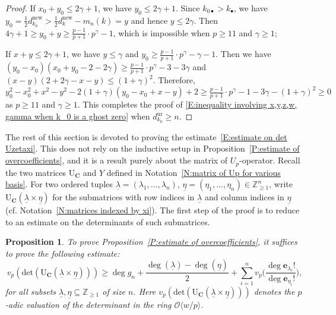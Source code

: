 \documentclass[12pt]{amsart}
\newtheorem{proposition}[subsection]{Proposition}
\theoremstyle{definition}
\numberwithin{equation}{subsection}
\def\calO{\mathcal{O}}
\def\ZZ{\mathbb{Z}}
\def\bfe{\mathbf{e}}
\def\bfC{\mathbf{C}}
\def\rmU{\mathrm{U}}
\newcommand{\new}{\mathrm{new}}
\renewcommand{\det}{\mathrm{det}}
\newcommand{\ur}{\mathrm{ur}}
\begin{document}
\begin{proof}
		 
        
        If $x_0+y_0\leq 2\gamma+1$, we have $y_0\leq 2\gamma+1$. Since $k_{0\bullet}>k_\bullet$, we have $y_0=\tfrac 12 d_{k_0}^\new>\tfrac 12 d_k^\new-m_n(k)=y$ and hence $y\leq 2\gamma$. Then $4\gamma+1\geq y_0+y\geq \frac{p-1}{p+1}\cdot p^\gamma-1$, which is impossible when $p\geq 11$ and $\gamma\geq 1$;
		
        If $x+y\leq 2\gamma+1$, we have $y\leq \gamma$ and $y_0\geq \frac{p-1}{p+1}\cdot p^\gamma-\gamma-1$. Then we have $(y_0-x_0)(x_0+y_0-2-2\gamma)\geq \frac{p-1}{p+1}\cdot p^\gamma-3-3\gamma$ and $(x-y)(2+2\gamma-x-y)\leq (1+\gamma)^2$. Therefore,
			\[
			y_0^2-x_0^2+x^2-y^2-2(1+\gamma)(y_0-x_0+x-y)+2\geq \tfrac{p-1}{p+1}\cdot p^\gamma-1-3\gamma-(1+\gamma)^2\geq 0
			\]
			as $p\geq 11$ and $\gamma\geq 1$. This completes the proof of \eqref{E:inequality involving x,y,z,w, gamma when k_0 is a ghost zero} when $d_{k_0}^\ur\geq n$.
		\qedhere 
\end{proof}

The rest of this section is devoted to proving the estimate~\eqref{E:estimate on det Uzetaxi}. This does not rely on the inductive setup in Proposition~\ref{P:estimate of overcoefficients}, and it is a result purely about the matrix of $U_p$-operator.  Recall the two matrices $\rmU_{\bfC}$ and $Y$ defined in Notation~\ref{N:matrix of Up for various basis}. For two ordered tuples $\underline \lambda=(\lambda_1,\dots, \lambda_n)$, $\underline \eta=(\eta_1,\dots, \eta_n)\in \ZZ_{\geq 1}^n$, write $\rmU_{\bfC}(\underline \lambda \times \underline \eta)$ for the submatrices with row indices in $\underline \lambda$ and column indices in $\underline \eta$ (cf. Notation~\ref{N:matrices indexed by xi}). The first step of the proof is to reduce to an estimate on the determinants of such submatrices.


\begin{proposition}
	\label{P:p-adic valuation of determinant of submatrices of U_C}
To prove Proposition~\ref{P:estimate of overcoefficients},  it suffices to prove the following estimate:
	\begin{equation}
	\label{E:estimate of vp det U_C lambda times eta}
	v_p(\det(\rmU_{\bfC}(\underline \lambda\times \underline \eta)))\geq \deg g_n+\frac{\deg(\underline \lambda) - \deg(\underline \eta) }2 + \sum_{i=1}^n v_p \Big( \frac{\deg\bfe_{\lambda_i}!}{\deg\bfe_{\eta_i}!}\Big),
	\end{equation}
	for all subsets $\underline \lambda,\underline \eta\subseteq  \ZZ_{\geq 1}$ of size $n$. Here $v_p(\det(\rmU_{\bfC}(\underline \lambda\times \underline \eta)))$ denotes the $p$-adic valuation of the determinant in the ring $\calO\langle w/p\rangle$.
\end{proposition}
\end{document}
